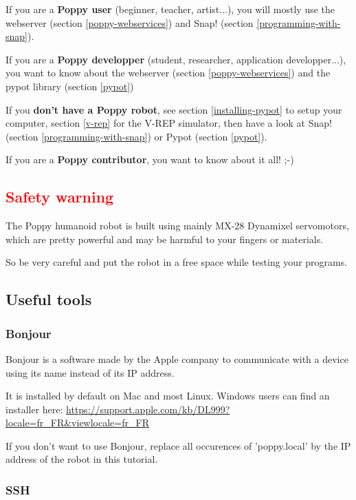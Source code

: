 \documentclass{article}
\begin{document}
If you are a \textbf{Poppy user} (beginner, teacher, artist...), you will mostly use the webserver (section \ref{poppy-webservices}) and Snap! (section \ref{programming-with-snap}).

If you are a \textbf{Poppy developper} (student, researcher, application developper...), you want to know about the webserver (section \ref{poppy-webservices}) and the pypot library (section \ref{pypot})

If you \textbf{don't have a Poppy robot}, see section \ref{installing-pypot} to setup your computer, section \ref{v-rep} for the V-REP simulator, then have a look at Snap! (section \ref{programming-with-snap}) or Pypot (section \ref{pypot}).

If you are a \textbf{Poppy contributor}, you want to know about it all! ;-)

\subsection{\textcolor{red}{Safety warning}}

The Poppy humanoid robot is built using mainly MX-28 Dynamixel servomotors, which are pretty powerful and may be harmful to your fingers or materials.

So be very careful and put the robot in a free space while testing your programs.

\subsection{Useful tools}

\subsubsection{Bonjour}

Bonjour is a software made by the Apple company to communicate with a device using its name instead of its IP address.

It is installed by default on Mac and most Linux. Windows users can find an installer here: \url{https://support.apple.com/kb/DL999?locale=fr_FR&viewlocale=fr_FR}

If you don't want to use Bonjour, replace all occurences of 'poppy.local' by the IP address of the robot in this tutorial.

\subsubsection{SSH}
\end{document}
